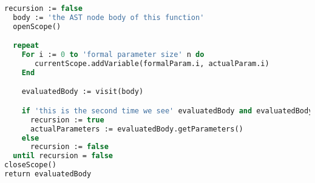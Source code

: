 \begin{lstlisting}[language=Pascal,label=alg:tailrecursion, caption={\emph{Detecting tail recursion during call of a function.}}]
  recursion := false
  body := 'the AST node body of this function'
  openScope()

  repeat
    For i := 0 to 'formal parameter size' n do
       currentScope.addVariable(formalParam.i, actualParam.i)
    End

    evaluatedBody := visit(body)

    if 'this is the second time we see' evaluatedBody and evaluatedBody.getFunction() = this then
      recursion := true
      actualParameters := evaluatedBody.getParameters()
    else
      recursion := false
  until recursion = false 
closeScope()
return evaluatedBody
\end{lstlisting}

%
%  
%  
